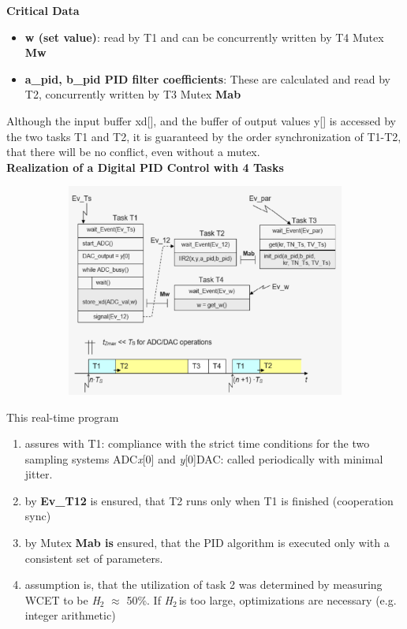 {\rot\bf Critical Data}

\begin{itemize}
\item \textbf{ w (set value)}: read by T1 and can be concurrently written by T4 Mutex \textbf{Mw}

\item \textbf{ a\_pid, b\_pid PID filter coefficients}: These are calculated and read by T2, concurrently written by T3  Mutex \textbf{Mab}
\end{itemize}

Although the input buffer xd[], and the buffer of output values y[] is accessed by the two tasks T1 and T2, it is guaranteed by the order synchronization of T1-T2, that there will be no conflict, even without a mutex.\\

\textbf{ Realization of a Digital PID Control with 4 Tasks}\\

	\begin{figure}[h]
    \centering
    \includegraphics[width=12cm, height=7cm]{Images/image154.png}
    \label{fig:Fig }
    \end{figure}

This real-time program 

\begin{enumerate}
\item  assures with T1: compliance with the strict time conditions for the two sampling systems ADC\textit{x}[0] and \textit{y}[0]DAC: called periodically with minimal jitter.

\item  by \textbf{Ev\_T12} is ensured, that T2 runs only when T1 is finished (cooperation sync)

\item  by Mutex \textbf{Mab is} ensured, that the PID algorithm is executed only with a consistent set of parameters.

\item  assumption is, that the utilization of task 2 was determined by measuring WCET to be \textit{H}${}_{2}$ $\mathrm{\approx}$ 50\%. If \textit{H}${}_{2\ }$is too large, optimizations are necessary (e.g. integer arithmetic) 
\end{enumerate}